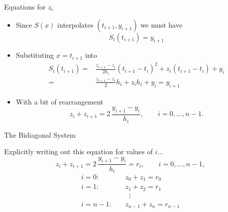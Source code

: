 \documentclass[10pt]{beamer}
\begin{document}
\begin{frame}{Equations for $z_i$}
\begin{itemize}
    \item  Since $S(x)$ interpolates $(t_{i+1},y_{i+1})$ we must have 
    $$
        S_i(t_{i+1}) = y_{i+1} 
    $$

\item Substituting $x=t_{i+1}$ into 
\begin{align*}    
S_i(t_{i+1})=&\frac{z_{i+1}-z_i}{2h_i}(t_{i+1}-t_i)^2+ z_i(t_{i+1}-t_i) + y_i\\
=&\frac{z_{i+1}-z_i}{2}h_i+ z_ih_i + y_i=y_{i+1}
\end{align*}
\item With a bit of rearrangement 
\[
z_i+z_{i+1}
=
2\,\frac{y_{i+1}-y_i}{h_i},
\qquad i=0,\dots,n-1.
\]
\end{itemize}
\end{frame}


\begin{frame}[shrink]{The Bidiagonal System}

Explicitly writing out this equation for values of $i\dots$
\[
z_i + z_{i+1}
=
2\,\frac{y_{i+1}-y_i}{h_i} = r_i,
\qquad i=0,\dots,n-1,
\]
\begin{align*}
i=0:\quad & z_0 + z_1 = r_0\\
i=1:\quad & z_1 + z_2 = r_1\\
& \;\;\vdots\\
i=n-1:\quad & z_{n-1} + z_n = r_{n-1}
\end{align*}



\end{frame}
\end{document}
